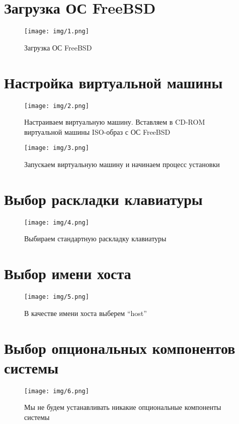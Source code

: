 \documentclass{gost}
\begin{document}
	\gostTitlePage

	\section{Загрузка ОС FreeBSD}
		\begin{figure}[H]
			\texttt{[image: img/1.png]}
			\caption{Загрузка ОС FreeBSD}
		\end{figure}

	\section{Настройка виртуальной машины}
		\begin{figure}[H]
			\texttt{[image: img/2.png]}
			\caption{Настраиваем виртуальную машину. Вставляем в CD-ROM виртуальной
			машины ISO-образ с ОС FreeBSD}
		\end{figure}

		\begin{figure}[H]
			\texttt{[image: img/3.png]}
			\caption{Запускаем виртуальную машину и начинаем процесс установки}
		\end{figure}

	\section{Выбор раскладки клавиатуры}
		\begin{figure}[H]
			\texttt{[image: img/4.png]}
			\caption{Выбираем стандартную раскладку клавиатуры}
		\end{figure}

	\section{Выбор имени хоста}
		\begin{figure}[H]
			\texttt{[image: img/5.png]}
			\caption{В качестве имени хоста выберем \enquote{host}}
		\end{figure}

	\section{Выбор опциональных компонентов системы}
		\begin{figure}[H]
			\texttt{[image: img/6.png]}
			\caption{Мы не будем устанавливать никакие опциональные компоненты системы}
		\end{figure}
\end{document}
